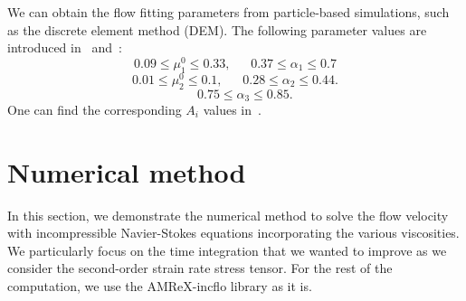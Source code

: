 We can obtain the flow fitting parameters from particle-based simulations, such as the discrete element method (DEM). The following parameter values are introduced in~\cite{jop_constitutive_2006} and~\cite{srivastava_viscometric_2021}:
    \[
    0.09 \leq \mu_1^0 \leq 0.33, 
    \ \ \ \ \ \ \ 
    0.37 \leq \alpha_1 \leq 0.7
    \]
        \[
    0.01 \leq \mu_2^0 \leq 0.1, 
    \ \ \ \ \ \ \ 
    0.28 \leq \alpha_2 \leq 0.44.
    \]
            \[
    \ \ \ \ \ \ \ 
    0.75 \leq \alpha_3 \leq 0.85.
    \]
     One can find the corresponding $A_i$ values in~\cite{srivastava_viscometric_2021}.

\section{Numerical method}
In this section, we demonstrate the numerical method to solve the flow velocity with incompressible Navier-Stokes equations incorporating the various viscosities. We particularly focus on the time integration that we wanted to improve as we consider the second-order strain rate stress tensor.
For the rest of the computation, we use the AMReX-incflo library as it is.
